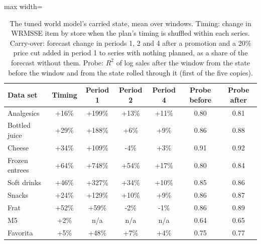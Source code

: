 \begin{table}[t]
\centering\footnotesize\setlength{\tabcolsep}{3pt}
\caption{The tuned world model's carried state, mean over windows. Timing: change in WRMSSE item by store when the
plan's timing is shuffled within each series. Carry-over: forecast change in periods 1, 2 and 4 after a promotion and a
20\% price cut added in period 1 to series with nothing planned, as a share of the forecast without them. Probe: $R^2$
of log sales after the window from the state before the window and from the state rolled through it (first of the
five copies).}
\label{tab:sup-mechanism}
\begin{adjustbox}{max width=\columnwidth}\begin{tabular}{lcccccc}
\toprule
Data set & Timing & Period 1 & Period 2 & Period 4 & Probe before & Probe after\\
\midrule
Analgesics & +16\% & +199\% & +13\% & +11\% & 0.80 & 0.81 \\
Bottled juice & +29\% & +188\% & +6\% & +9\% & 0.86 & 0.88 \\
Cheese & +34\% & +109\% & -4\% & +3\% & 0.91 & 0.92 \\
Frozen entrees & +64\% & +748\% & +54\% & +17\% & 0.80 & 0.84 \\
Soft drinks & +46\% & +327\% & +34\% & +10\% & 0.85 & 0.86 \\
Snacks & +24\% & +129\% & +10\% & +9\% & 0.86 & 0.87 \\
Frat & +52\% & +59\% & -2\% & -1\% & 0.86 & 0.89 \\
M5 & +2\% & n/a & n/a & n/a & 0.64 & 0.65 \\
Favorita & +5\% & +48\% & +7\% & +4\% & 0.75 & 0.77 \\
\bottomrule
\end{tabular}\end{adjustbox}
\end{table}
